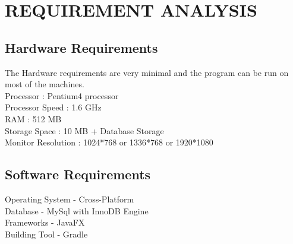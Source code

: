 \chapter{REQUIREMENT ANALYSIS}

\section{Hardware Requirements}
The Hardware requirements are very minimal and the program can be run on most of
the machines. \\
Processor : Pentium4 processor\\
Processor Speed : 1.6 GHz\\
RAM : 512 MB\\
Storage Space : 10 MB + Database Storage\\
Monitor Resolution : 1024*768 or 1336*768 or 1920*1080\\
\thispagestyle{fancy}

\section{Software Requirements}
Operating System - Cross-Platform\\
Database - MySql with InnoDB Engine\\
Frameworks - JavaFX\\
Building Tool - Gradle
